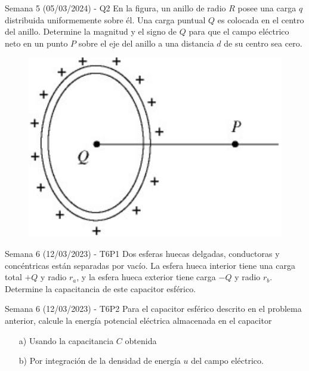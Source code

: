 \begin{frame}{Semana 5 (05/03/2024) - Q2}
    En la figura, un anillo de radio $R$ posee una carga $q$ distribuida uniformemente sobre él. Una carga puntual $Q$ es colocada en el centro del anillo. Determine la magnitud y el signo de $Q$ para que el campo eléctrico neto en un punto $P$ sobre el eje del anillo a una distancia $d$ de su centro sea cero. \\
    
    \begin{figure}[H]
        \centering
        \includegraphics[scale=0.3]{figures/q2.png}
    \end{figure}
\end{frame}

\begin{frame}{Semana 6 (12/03/2023) - T6P1}
    Dos esferas huecas delgadas, conductoras y concéntricas están separadas por vacío. La esfera hueca interior tiene una carga total $+Q$ y radio $r_a$, y la esfera hueca exterior tiene carga $-Q$ y radio $r_b$. Determine la capacitancia de este capacitor esférico.
\end{frame}

\begin{frame}{Semana 6 (12/03/2023) - T6P2}
    Para el capacitor esférico descrito en el problema anterior, calcule la energía potencial eléctrica almacenada en el capacitor
    
    \begin{itemize}
        \item[a)] Usando la capacitancia $C$ obtenida
        \item[b)] Por integración de la densidad de energía $u$ del campo eléctrico.
    \end{itemize}
\end{frame}

